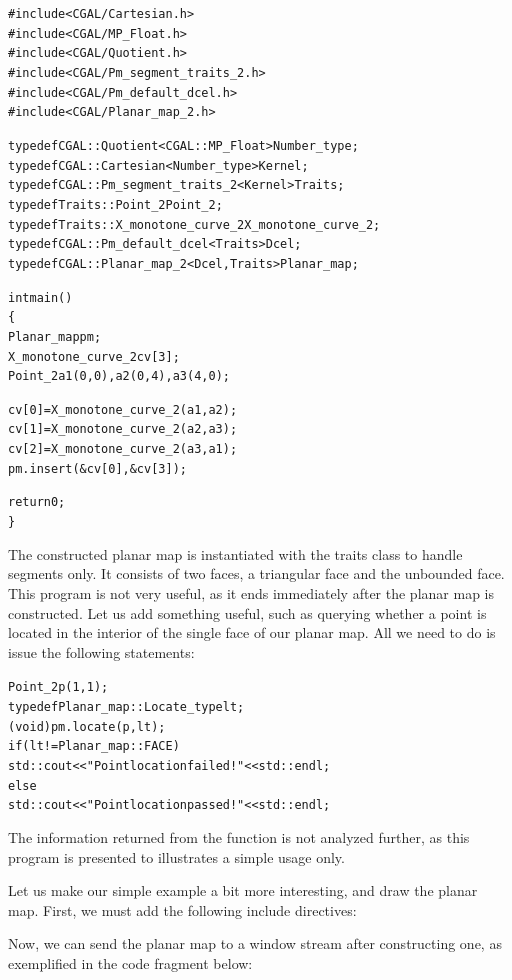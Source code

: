 \begin{alltt}
#include <CGAL/Cartesian.h>
#include <CGAL/MP_Float.h>
#include <CGAL/Quotient.h>
#include <CGAL/Pm_segment_traits_2.h>
#include <CGAL/Pm_default_dcel.h>
#include <CGAL/Planar_map_2.h>

typedef CGAL::Quotient<CGAL::MP_Float>    Number_type;
typedef CGAL::Cartesian<Number_type>      Kernel;
typedef CGAL::Pm_segment_traits_2<Kernel> Traits;
typedef Traits::Point_2                   Point_2;
typedef Traits::X_monotone_curve_2        X_monotone_curve_2;
typedef CGAL::Pm_default_dcel<Traits>     Dcel;
typedef CGAL::Planar_map_2<Dcel,Traits>   Planar_map;

int main()
\{
  Planar_map pm;
  X_monotone_curve_2 cv[3];
  Point_2 a1(0,0), a2(0,4), a3(4,0);
 
  cv[0] = X_monotone_curve_2(a1,a2);
  cv[1] = X_monotone_curve_2(a2,a3);
  cv[2] = X_monotone_curve_2(a3,a1);
  pm.insert(&cv[0], &cv[3]);

  return 0;
\}
\end{alltt}

The constructed planar map is instantiated with the
 traits class to handle segments only. It
consists of two faces, a triangular face and the unbounded face.
This program is not very useful, as it ends immediately after the
planar map is constructed. Let us add something useful, such as
querying whether a point is located in the interior of the single
face of our planar map. All we need to do is issue the following
statements:

\begin{alltt}
  Point_2 p(1,1);
  typedef Planar_map::Locate_type lt;
  (void) pm.locate(p, lt);
  if (lt != Planar_map::FACE)
    std::cout << "Point location failed!" << std::endl;
  else
    std::cout << "Point location passed!" << std::endl;
\end{alltt}

The information returned from the  function is
not analyzed further, as this program is presented to illustrates a
simple usage only.

Let us make our simple example a bit more interesting, and draw
the planar map. First, we must add the following include
directives:


Now, we can send the planar map to a window stream after constructing
one, as exemplified in the code fragment below:

